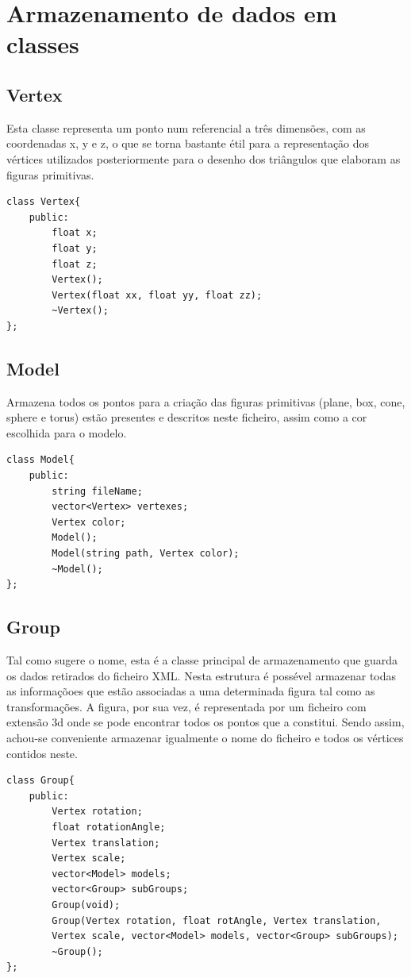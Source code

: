 \documentclass[12pt]{article}
\begin{document}
\section{Armazenamento de dados em classes}
\subsection{Vertex}
Esta classe representa um ponto num referencial a três dimensões, com as
coordenadas x, y e z, o que se torna bastante étil para a representação dos
vértices utilizados posteriormente para o desenho dos triângulos que elaboram as figuras primitivas.
\begin{lstlisting}
class Vertex{
	public:
		float x;
		float y;
		float z;
		Vertex();
		Vertex(float xx, float yy, float zz);
		~Vertex();
};
\end{lstlisting}
\subsection{Model}
Armazena todos os pontos para a criação das figuras primitivas (plane, box,
cone, sphere e torus) estão presentes e descritos neste ficheiro, assim como a cor escolhida para o modelo.
\begin{lstlisting}
class Model{
	public:
		string fileName;
		vector<Vertex> vertexes;
		Vertex color;
		Model();
		Model(string path, Vertex color);
		~Model();
};
\end{lstlisting}
\subsection{Group}
Tal como sugere o nome, esta é a classe principal de armazenamento que
guarda os dados retirados do ficheiro XML.
Nesta estrutura é possével armazenar todas as informaçõoes que estão associadas a uma determinada figura tal 
como as transformações. A figura, por sua vez, é representada por um ficheiro com extensão
3d onde se pode encontrar todos os pontos que a constitui. Sendo assim,
achou-se conveniente armazenar igualmente o nome do ficheiro e todos os
vértices contidos neste.
\begin{lstlisting}
class Group{
	public:
		Vertex rotation;
		float rotationAngle;
		Vertex translation;
		Vertex scale;
		vector<Model> models;
		vector<Group> subGroups;
		Group(void);
		Group(Vertex rotation, float rotAngle, Vertex translation, 
		Vertex scale, vector<Model> models, vector<Group> subGroups);
		~Group();
};
\end{lstlisting}
\end{document}
